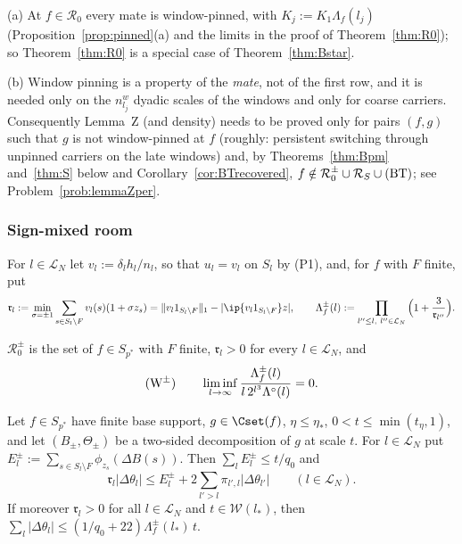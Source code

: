 \begin{remark}\label{rem:Bstar}
(a) At $f\in\mathcal R_0$ every mate is window-pinned, with
$K_j:=K_1\Lambda_f(l_j)$ (Proposition~\ref{prop:pinned}(a) and the limits
in the proof of Theorem~\ref{thm:R0}); so Theorem~\ref{thm:R0} is a special
case of Theorem~\ref{thm:Bstar}.

(b) Window pinning is a property of the \emph{mate}, not of the first row,
and it is needed only on the $n^w_{l_j}$ dyadic scales of the windows and
only for coarse carriers.  Consequently Lemma~Z (and density) needs to be
proved only for pairs $(f,g)$ such that $g$ is not window-pinned at $f$
(roughly: persistent switching through unpinned carriers on the late
windows) and, by Theorems~\ref{thm:Bpm} and~\ref{thm:S} below and
Corollary~\ref{cor:BTrecovered}, $f\notin\mathcal R_0^\pm\cup\mathcal
R_S\cup\textup{(BT)}$; see Problem~\ref{prob:lemmaZper}.
\end{remark}

\subsubsection*{Sign-mixed room}
For $l\in\mathcal L_N$ let $v_l:=\delta_lh_l/n_l$, so that $u_l=v_l$ on
$S_l$ by (P1), and, for $f$ with $F$ finite, put
\[
 \mathfrak r_l:=\min_{\sigma=\pm1}\sum_{s\in S_l\setminus F}v_l(s)
 (1+\sigma z_s)=\|v_l1_{S_l\setminus F}\|_1-|\ip{v_l1_{S_l\setminus F}}z|,
 \qquad
 \Lambda^\pm_f(l):=\prod_{l''\le l,\ l''\in\mathcal L_N}\Big(1+
 \frac3{\mathfrak r_{l''}}\Big).
\]

\begin{definition}\label{def:R0pm}
$\mathcal R_0^\pm$ is the set of $f\in S_{p^*}$ with $F$ finite,
$\mathfrak r_l>0$ for every $l\in\mathcal L_N$, and
\[
 \textup{(W$^\pm$)}\qquad\liminf_{l\to\infty}\frac{\Lambda^\pm_f(l)}
 {l\,2^{l^3}\Lambda^\circ(l)}=0 .
\]
\end{definition}

\begin{lemma}\label{lem:signmixed}
Let $f\in S_{p^*}$ have finite base support, $g\in\Cset(f)$, $\eta\le
\eta_*$, $0<t\le\min(t_\eta,1)$, and let $(B_\pm,\Theta_\pm)$ be a
two-sided decomposition of $g$ at scale $t$.  For $l\in\mathcal L_N$ put
$E^\pm_l:=\sum_{s\in S_l\setminus F}\phi_{z_s}(\Delta B(s))$.  Then
$\sum_lE^\pm_l\le t/q_0$ and
\[
 \mathfrak r_l|\Delta\theta_l|\le E^\pm_l+2\sum_{l'>l}\pi_{l',l}
 |\Delta\theta_{l'}|\qquad(l\in\mathcal L_N).
\]
If moreover $\mathfrak r_l>0$ for all $l\in\mathcal L_N$ and
$t\in\mathcal W(l_*)$, then $\sum_l|\Delta\theta_l|\le(1/q_0+22)
\Lambda^\pm_f(l_*)\,t$.
\end{lemma}

